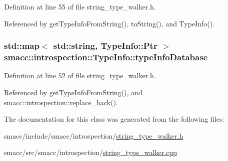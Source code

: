 Definition at line 55 of file string\+\_\+type\+\_\+walker.\+h.



Referenced by get\+Type\+Info\+From\+String(), to\+String(), and Type\+Info().

\subsubsection[{\texorpdfstring{type\+Info\+Database}{typeInfoDatabase}}]{\setlength{\rightskip}{0pt plus 5cm}std\+::map$<$ std\+::string, {\bf Type\+Info\+::\+Ptr} $>$ smacc\+::introspection\+::\+Type\+Info\+::type\+Info\+Database\hspace{0.3cm}{\ttfamily [static]}}\hypertarget{classsmacc_1_1introspection_1_1TypeInfo_ab780c03206b824aaf338135d16b0eff4}{}\label{classsmacc_1_1introspection_1_1TypeInfo_ab780c03206b824aaf338135d16b0eff4}


Definition at line 52 of file string\+\_\+type\+\_\+walker.\+h.



Referenced by get\+Type\+Info\+From\+String(), and smacc\+::introspection\+::replace\+\_\+back().



The documentation for this class was generated from the following files\+:\begin{DoxyCompactItemize}
\item 
smacc/include/smacc/introspection/\hyperlink{string__type__walker_8h}{string\+\_\+type\+\_\+walker.\+h}\item 
smacc/src/smacc/introspection/\hyperlink{string__type__walker_8cpp}{string\+\_\+type\+\_\+walker.\+cpp}\end{DoxyCompactItemize}
